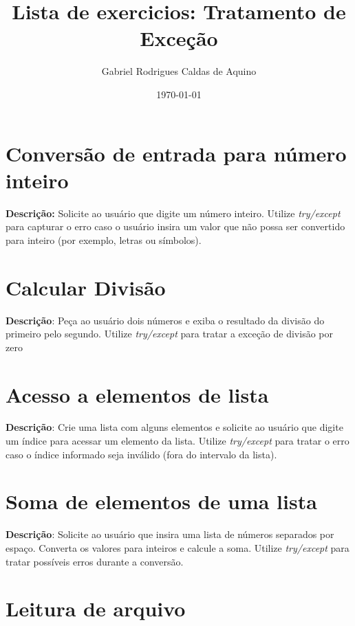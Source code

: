 \title{Lista de exercicios: Tratamento de Exceção}
\author{Gabriel Rodrigues Caldas de Aquino}
\date{\today}



\maketitle

\section{Conversão de entrada para número inteiro}

\textbf{Descrição:}
Solicite ao usuário que digite um número inteiro. Utilize \textit{try/except} para capturar o erro caso o usuário insira um valor que não possa ser convertido para inteiro (por exemplo, letras ou símbolos).

\section{Calcular Divisão}

\textbf{Descrição}:
Peça ao usuário dois números e exiba o resultado da divisão do primeiro pelo segundo. Utilize \textit{try/except} para tratar a exceção de divisão por zero

\section{Acesso a elementos de lista}

\textbf{Descrição}:
Crie uma lista com alguns elementos e solicite ao usuário que digite um índice para acessar um elemento da lista. Utilize \textit{try/except} para tratar o erro caso o índice informado seja inválido (fora do intervalo da lista).

\section{Soma de elementos de uma lista}

\textbf{Descrição}:
Solicite ao usuário que insira uma lista de números separados por espaço. Converta os valores para inteiros e calcule a soma. Utilize \textit{try/except} para tratar possíveis erros durante a conversão.

\section{Leitura de arquivo}

